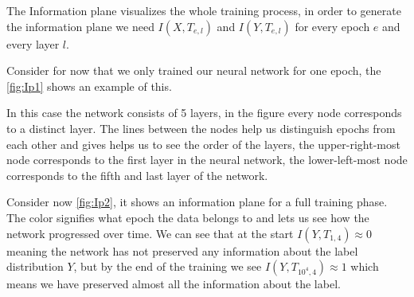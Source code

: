 \documentclass[dissertation.tex]{subfiles}
\begin{document}
The Information plane visualizes the whole training process, in order to
generate the information plane we need $I(X,T_{e,l})$ and $I(Y,T_{e,l})$ for every
epoch $e$ and every layer $l$.

Consider for now that we only trained our neural network for one epoch, the
\autoref{fig:Ip1} shows an example of this. 

In this case the network consists of 5 layers, in the figure every node
corresponds to a distinct layer. The lines between the nodes help us distinguish
epochs from each other and gives helps us to see the order of the layers, the
upper-right-most node corresponds to the first layer in the neural network, the
lower-left-most node corresponds to the fifth and last layer of the network.

Consider now \autoref{fig:Ip2}, it shows an information plane for a full
training phase. The color signifies what epoch the data belongs to and lets us
see how the network progressed over time. We can see that at the start $I(Y,
T_{1,4}) \approx 0$ meaning the network has not preserved any information about
the label distribution $Y$, but by the end of the training we see $I(Y,
T_{10^4,4}) \approx 1$ which means we have preserved almost all the information
about the label.
\end{document}

